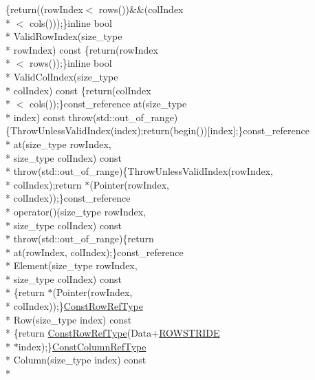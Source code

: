 \begin{DoxyCompactItemize}
\{return((row\-Index$<$ rows())\&\&(col\-Index\\*
$<$ cols()));\}inline bool \\*
Valid\-Row\-Index(size\-\_\-type \\*
row\-Index) const \{return(row\-Index\\*
$<$ rows());\}inline bool \\*
Valid\-Col\-Index(size\-\_\-type \\*
col\-Index) const \{return(col\-Index\\*
$<$ cols());\}const\-\_\-reference at(size\-\_\-type \\*
index) const throw(std\-::out\-\_\-of\-\_\-range)\{Throw\-Unless\-Valid\-Index(index);return(begin())\mbox{[}index\mbox{]};\}const\-\_\-reference \\*
at(size\-\_\-type row\-Index, \\*
size\-\_\-type col\-Index) const \\*
throw(std\-::out\-\_\-of\-\_\-range)\{Throw\-Unless\-Valid\-Index(row\-Index, \\*
col\-Index);return $\ast$(Pointer(row\-Index, \\*
col\-Index));\}const\-\_\-reference \\*
operator()(size\-\_\-type row\-Index, \\*
size\-\_\-type col\-Index) const \\*
throw(std\-::out\-\_\-of\-\_\-range)\{return \\*
at(row\-Index, col\-Index);\}const\-\_\-reference \\*
Element(size\-\_\-type row\-Index, \\*
size\-\_\-type col\-Index) const \\*
\{return $\ast$(Pointer(row\-Index, \\*
col\-Index));\}\hyperlink{classvct_fixed_size_const_matrix_base_a74355396eec7437755398c2810e0df41}{Const\-Row\-Ref\-Type} \\*
Row(size\-\_\-type index) const \\*
\{return \hyperlink{classvct_fixed_size_const_matrix_base_a74355396eec7437755398c2810e0df41}{Const\-Row\-Ref\-Type}(Data+\hyperlink{classvct_fixed_size_const_matrix_base_a0aa9b864b8810dd6a50640c965564bd0a1249f054e777d0972eee94e9e33c3f4f}{R\-O\-W\-S\-T\-R\-I\-D\-E} \\*
$\ast$index);\}\hyperlink{classvct_fixed_size_const_matrix_base_a68ed47f84a2855832fa0c18fafda6843}{Const\-Column\-Ref\-Type} \\*
Column(size\-\_\-type index) const \\*

\end{DoxyCompactItemize}
